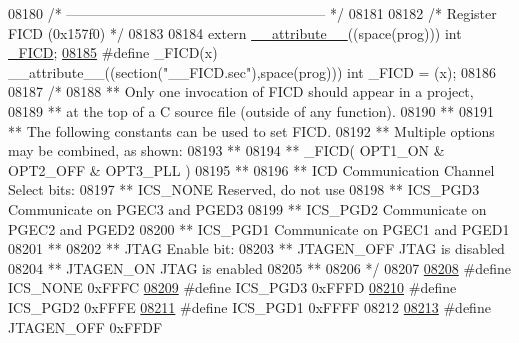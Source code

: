 \begin{DoxyCode}
08180 \textcolor{comment}{/* -------------------------------------------------------- */}
08181 
08182 \textcolor{comment}{/* Register FICD (0x157f0)                               */}
08183 
08184 \textcolor{keyword}{extern} \hyperlink{a00009_a493c46f03454991ccc5aa7a6e1dfb2a7}{\_\_attribute\_\_}((space(prog))) int \hyperlink{a00009_a4d9c4d6bf16ae6027c414d8388c76007}{\_FICD};
\hypertarget{a00009_source_l08185}{}\hyperlink{a00009_a4d9c4d6bf16ae6027c414d8388c76007}{08185} \textcolor{preprocessor}{#define \_FICD(x) \_\_attribute\_\_((section("\_\_FICD.sec"),space(prog))) int \_FICD = (x);}
08186 
08187 \textcolor{comment}{/*}
08188 \textcolor{comment}{** Only one invocation of FICD should appear in a project,}
08189 \textcolor{comment}{** at the top of a C source file (outside of any function).}
08190 \textcolor{comment}{**}
08191 \textcolor{comment}{** The following constants can be used to set FICD.}
08192 \textcolor{comment}{** Multiple options may be combined, as shown:}
08193 \textcolor{comment}{**}
08194 \textcolor{comment}{** \_FICD( OPT1\_ON & OPT2\_OFF & OPT3\_PLL )}
08195 \textcolor{comment}{**}
08196 \textcolor{comment}{**   ICD Communication Channel Select bits:}
08197 \textcolor{comment}{**     ICS\_NONE             Reserved, do not use}
08198 \textcolor{comment}{**     ICS\_PGD3             Communicate on PGEC3 and PGED3}
08199 \textcolor{comment}{**     ICS\_PGD2             Communicate on PGEC2 and PGED2}
08200 \textcolor{comment}{**     ICS\_PGD1             Communicate on PGEC1 and PGED1}
08201 \textcolor{comment}{**}
08202 \textcolor{comment}{**   JTAG Enable bit:}
08203 \textcolor{comment}{**     JTAGEN\_OFF           JTAG is disabled}
08204 \textcolor{comment}{**     JTAGEN\_ON            JTAG is enabled}
08205 \textcolor{comment}{**}
08206 \textcolor{comment}{*/}
08207 
\hypertarget{a00009_source_l08208}{}\hyperlink{a00009_ac6f8547ed8c3128b72d835f2fd8742b1}{08208} \textcolor{preprocessor}{#define ICS\_NONE             0xFFFC}
\hypertarget{a00009_source_l08209}{}\hyperlink{a00009_a3a3eace1cc13292c1e643c1175d68972}{08209} \textcolor{preprocessor}{#define ICS\_PGD3             0xFFFD}
\hypertarget{a00009_source_l08210}{}\hyperlink{a00009_af50582f3e40f65e82a7b29739ee8b9df}{08210} \textcolor{preprocessor}{#define ICS\_PGD2             0xFFFE}
\hypertarget{a00009_source_l08211}{}\hyperlink{a00009_a5ba2dee9be5da4df5baa110e772834c6}{08211} \textcolor{preprocessor}{#define ICS\_PGD1             0xFFFF}
08212 
\hypertarget{a00009_source_l08213}{}\hyperlink{a00009_a75ad63dd6b02e3c6ef56a1a36e796912}{08213} \textcolor{preprocessor}{#define JTAGEN\_OFF           0xFFDF}

\end{DoxyCode}
